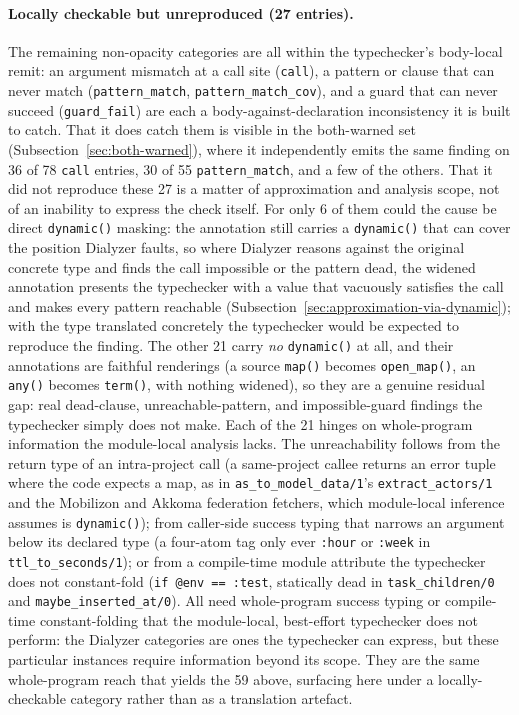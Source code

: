 \paragraph{Locally checkable but unreproduced (27 entries).}
The remaining non-opacity categories are all within the typechecker's body-local remit: an argument mismatch at a call site (\texttt{call}), a pattern or clause that can never match (\texttt{pattern\_match}, \texttt{pattern\_match\_cov}), and a guard that can never succeed (\texttt{guard\_fail}) are each a body-against-declaration inconsistency it is built to catch.
That it does catch them is visible in the both-warned set (Subsection~\ref{sec:both-warned}), where it independently emits the same finding on 36 of 78 \texttt{call} entries, 30 of 55 \texttt{pattern\_match}, and a few of the others.
That it did not reproduce these 27 is a matter of approximation and analysis scope, not of an inability to express the check itself.
For only 6 of them could the cause be direct \texttt{dynamic()} masking: the annotation still carries a \texttt{dynamic()} that can cover the position Dialyzer faults, so where Dialyzer reasons against the original concrete type and finds the call impossible or the pattern dead, the widened annotation presents the typechecker with a value that vacuously satisfies the call and makes every pattern reachable (Subsection~\ref{sec:approximation-via-dynamic}); with the type translated concretely the typechecker would be expected to reproduce the finding.
The other 21 carry \emph{no} \texttt{dynamic()} at all, and their annotations are faithful renderings (a source \texttt{map()} becomes \texttt{open\_map()}, an \texttt{any()} becomes \texttt{term()}, with nothing widened), so they are a genuine residual gap: real dead-clause, unreachable-pattern, and impossible-guard findings the typechecker simply does not make.
Each of the 21 hinges on whole-program information the module-local analysis lacks. The unreachability follows from the return type of an intra-project call (a same-project callee returns an error tuple where the code expects a map, as in \texttt{as\_to\_model\_data/1}'s \texttt{extract\_actors/1} and the Mobilizon and Akkoma federation fetchers, which module-local inference assumes is \texttt{dynamic()}); from caller-side success typing that narrows an argument below its declared type (a four-atom tag only ever \texttt{:hour} or \texttt{:week} in \texttt{ttl\_to\_seconds/1}); or from a compile-time module attribute the typechecker does not constant-fold (\texttt{if @env == :test}, statically dead in \texttt{task\_children/0} and \texttt{maybe\_inserted\_at/0}).
All need whole-program success typing or compile-time constant-folding that the module-local, best-effort typechecker does not perform: the Dialyzer categories are ones the typechecker can express, but these particular instances require information beyond its scope. They are the same whole-program reach that yields the 59 above, surfacing here under a locally-checkable category rather than as a translation artefact.

